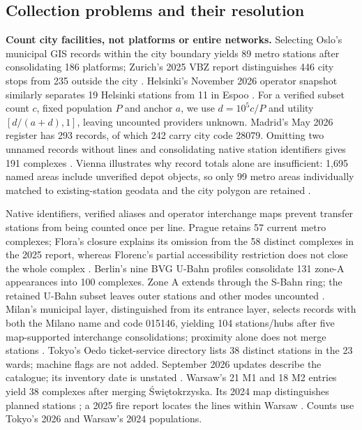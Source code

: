 \subsection{Collection problems and their resolution}
\textbf{Count city facilities, not platforms or entire networks.}
Selecting Oslo's municipal GIS records within the city boundary yields 89
metro stations after consolidating 186
platforms; Zurich's 2025 VBZ report distinguishes 446 city stops from 235
outside the city \cite{oslo,vbz}. Helsinki's November 2026 operator snapshot
similarly separates 19 Helsinki stations from 11 in Espoo \cite{helsinki}.
For a verified subset count $c$, fixed population $P$ and anchor $a$, we use
$d=10^5c/P$ and utility $[d/(a+d),1]$, leaving uncounted providers unknown.
Madrid's May 2026 register has 293 records, of which 242 carry city code
28079. Omitting two unnamed records without lines and consolidating native
station identifiers gives 191 complexes \cite{madridmetro,inecodes}. Vienna illustrates why record totals
alone are insufficient: 1,695 named areas include unverified depot objects,
so only 99 metro areas individually matched to existing-station geodata and
the city polygon are retained \cite{viennaogd,viennagis}.

Native identifiers, verified aliases and operator interchange maps prevent
transfer stations from being counted once per line. Prague retains 57 current
metro complexes; Flora's closure explains its omission from the 58 distinct
complexes in the 2025 report, whereas Florenc's partial accessibility restriction
does not close the whole complex \cite{pidmetro,dpp2025,floraclose}.
Berlin's nine BVG U-Bahn profiles consolidate 131 zone-A appearances into 100
complexes. Zone A extends through the S-Bahn ring; the retained U-Bahn subset
leaves outer stations and other modes uncounted
\cite{bvg}. Milan's municipal layer, distinguished from its entrance layer,
selects records with both the Milano name and code 015146, yielding 104
stations/hubs after five map-supported interchange consolidations;
proximity alone does not merge stations \cite{milanmetro}.
Tokyo's Oedo ticket-service directory lists 38 distinct stations in the 23
wards; machine flags are not added. September 2026 updates describe the catalogue; its inventory
date is unstated \cite{tokyooedo}. Warsaw's 21 M1 and 18 M2 entries yield 38
complexes after merging \'Swi\k{e}tokrzyska. Its 2024 map distinguishes planned
stations \cite{warsawmetro}; a 2025 fire report locates the lines within Warsaw
\cite{warsawfirescope}. Counts use Tokyo's 2026 and Warsaw's 2024 populations.

